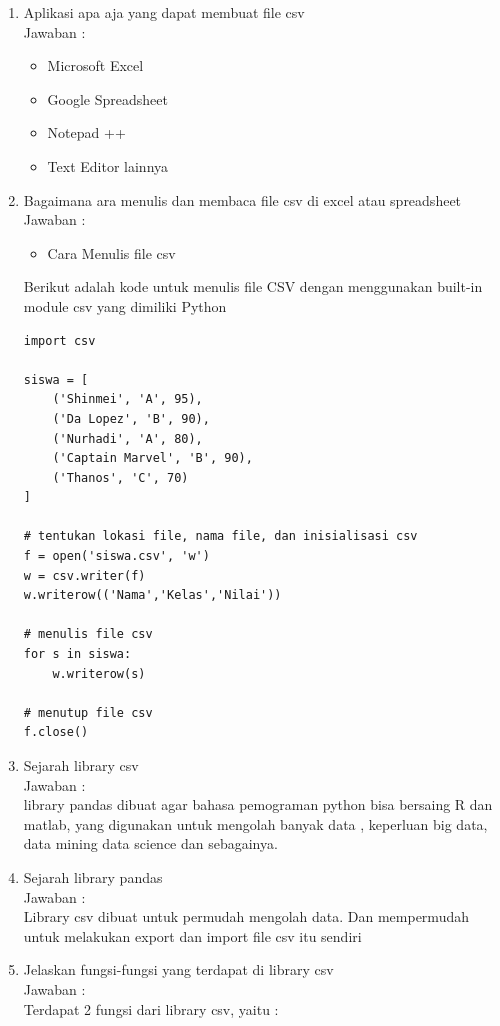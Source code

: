 \begin{enumerate}
\item Aplikasi apa aja yang dapat membuat file csv\\
Jawaban :

\begin{itemize}
\item Microsoft Excel
\item Google Spreadsheet
\item Notepad ++
\item Text Editor lainnya
\end{itemize}

\item  Bagaimana ara menulis dan membaca file csv di excel atau spreadsheet\\
Jawaban :

\begin{itemize}
\item Cara Menulis file csv
\end{itemize}
Berikut adalah kode untuk menulis file CSV dengan menggunakan built-in module csv yang dimiliki Python

\begin{verbatim}
import csv

siswa = [
    ('Shinmei', 'A', 95),
    ('Da Lopez', 'B', 90),
    ('Nurhadi', 'A', 80),
    ('Captain Marvel', 'B', 90),
    ('Thanos', 'C', 70)
]

# tentukan lokasi file, nama file, dan inisialisasi csv
f = open('siswa.csv', 'w')
w = csv.writer(f)
w.writerow(('Nama','Kelas','Nilai'))

# menulis file csv
for s in siswa:
    w.writerow(s)

# menutup file csv
f.close()
\end{verbatim}


\item Sejarah library csv\\
Jawaban :\\
 library pandas dibuat agar bahasa pemograman python bisa bersaing R dan matlab, yang digunakan untuk mengolah banyak data , keperluan big data, data mining data science dan sebagainya.

\item Sejarah library pandas\\
Jawaban :\\
Library csv dibuat untuk permudah mengolah data. Dan mempermudah untuk melakukan export dan import file csv itu sendiri


\item Jelaskan  fungsi-fungsi yang terdapat di library csv\\
Jawaban :\\
Terdapat 2 fungsi dari library csv, yaitu :


\end{enumerate}
